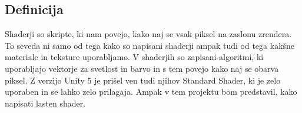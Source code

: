 {\color{indiagreen}\subsection{Definicija}}
Shaderji so skripte, ki nam povejo, kako naj se vsak piksel na zaslonu zrendera. To seveda ni samo od tega kako so napisani shaderji ampak tudi od tega kakšne materiale in teksture uporabljamo. V shaderjih so zapisani algoritmi, ki uporabljajo vektorje za svetlost in barvo in s tem povejo kako naj se obarva piksel. Z verzijo Unity 5 je prišel ven tudi njihov Standard Shader, ki je zelo uporaben in se lahko zelo prilagaja. Ampak v tem projektu bom predstavil, kako napisati lasten shader. 